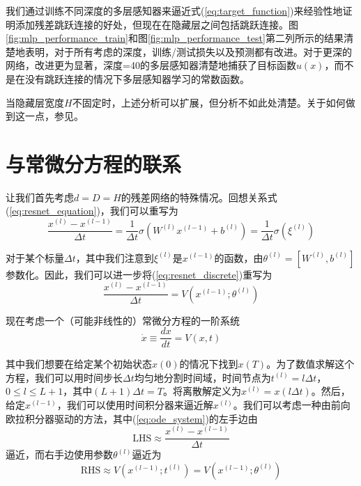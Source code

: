 我们通过训练不同深度的多层感知器来逼近式(\ref{eq:target_function})来经验性地证明添加残差跳跃连接的好处，但现在在隐藏层之间包括跳跃连接。图\ref{fig:mlp_performance_train}和图\ref{fig:mlp_performance_test}第二列所示的结果清楚地表明，对于所有考虑的深度，训练/测试损失以及预测都有改进。对于更深的网络，改进更为显著，深度=40的多层感知器清楚地捕获了目标函数$u(x)$，而不是在没有跳跃连接的情况下多层感知器学习的常数函数。

\begin{remark}
当隐藏层宽度$H$不固定时，上述分析可以扩展，但分析不如此处清楚。关于如何做到这一点，参见\cite{he2015}。
\end{remark}

\section{与常微分方程的联系}
\label{sec:connections_odes}

让我们首先考虑$d = D = H$的残差网络的特殊情况。回想关系式(\ref{eq:resnet_equation})，我们可以重写为
\begin{equation}
\frac{x^{(l)} - x^{(l-1)}}{\Delta t} = \frac{1}{\Delta t} \sigma(W^{(l)} x^{(l-1)} + b^{(l)}) = \frac{1}{\Delta t} \sigma(\xi^{(l)})
\label{eq:resnet_discrete}
\end{equation}

对于某个标量$\Delta t$，其中我们注意到$\xi^{(l)}$是$x^{(l-1)}$的函数，由$\theta^{(l)} = [W^{(l)}, b^{(l)}]$参数化。因此，我们可以进一步将(\ref{eq:resnet_discrete})重写为
\begin{equation}
\frac{x^{(l)} - x^{(l-1)}}{\Delta t} = V(x^{(l-1)}; \theta^{(l)})
\label{eq:resnet_ode_form}
\end{equation}

现在考虑一个（可能非线性的）常微分方程的一阶系统
\begin{equation}
\dot{x} \equiv \frac{dx}{dt} = V(x, t)
\label{eq:ode_system}
\end{equation}

其中我们想要在给定某个初始状态$x(0)$的情况下找到$x(T)$。为了数值求解这个方程，我们可以用时间步长$\Delta t$均匀地分割时间域，时间节点为$t^{(l)} = l\Delta t$，$0 \leq l \leq L + 1$，其中$(L + 1)\Delta t = T$。将离散解定义为$x^{(l)} = x(l\Delta t)$。然后，给定$x^{(l-1)}$，我们可以使用时间积分器来逼近解$x^{(l)}$。我们可以考虑一种由前向欧拉积分器驱动的方法，其中(\ref{eq:ode_system})的左手边由
\begin{equation}
\text{LHS} \approx \frac{x^{(l)} - x^{(l-1)}}{\Delta t}
\end{equation}
逼近，而右手边使用参数$\theta^{(l)}$逼近为
\begin{equation}
\text{RHS} \approx V(x^{(l-1)}; t^{(l)}) = V(x^{(l-1)}; \theta^{(l)})
\end{equation}

